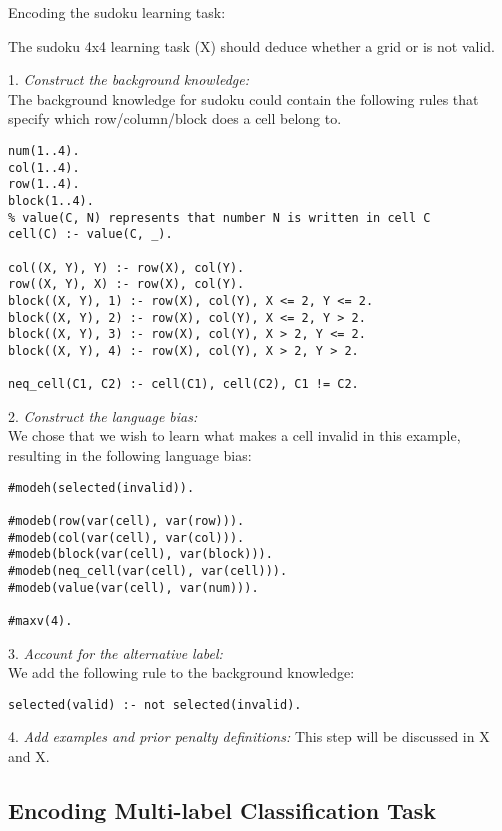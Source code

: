\begin{example}
Encoding the sudoku learning task:

The sudoku 4x4 learning task (X) should deduce whether a grid or is not valid.

1. \textit{Construct the background knowledge:} \\
The background knowledge for sudoku could contain the following rules that specify which row/column/block does a cell belong to.
\begin{verbatim}
num(1..4).
col(1..4).
row(1..4).
block(1..4).
% value(C, N) represents that number N is written in cell C
cell(C) :- value(C, _).

col((X, Y), Y) :- row(X), col(Y).
row((X, Y), X) :- row(X), col(Y).
block((X, Y), 1) :- row(X), col(Y), X <= 2, Y <= 2.
block((X, Y), 2) :- row(X), col(Y), X <= 2, Y > 2.
block((X, Y), 3) :- row(X), col(Y), X > 2, Y <= 2.
block((X, Y), 4) :- row(X), col(Y), X > 2, Y > 2.

neq_cell(C1, C2) :- cell(C1), cell(C2), C1 != C2.
\end{verbatim}

2. \textit{Construct the language bias:} \\
We chose that we wish to learn what makes a cell invalid in this example, resulting in the following language bias:
\begin{verbatim}
#modeh(selected(invalid)).

#modeb(row(var(cell), var(row))).
#modeb(col(var(cell), var(col))).
#modeb(block(var(cell), var(block))).
#modeb(neq_cell(var(cell), var(cell))).
#modeb(value(var(cell), var(num))).

#maxv(4).
\end{verbatim}

3. \textit{Account for the alternative label:} \\
We add the following rule to the background knowledge:
\begin{verbatim}
selected(valid) :- not selected(invalid). 
\end{verbatim}

4. \textit{Add examples and prior penalty definitions:}
This step will be discussed in X and X.
\end{example}

\subsection{Encoding Multi-label Classification Task}


